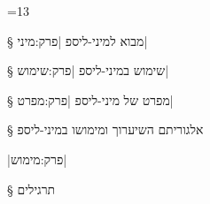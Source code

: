 \def\Title{שפת מיני-ליספ וכתיבת המשערך שלה בה עצמה}


\providecommand{\TopAlign}[1]{\adjustbox{valign=t}{#1}}

{%
    \makeatletter
    =13\relax%
    \gdef\fixNewLine{%
        \def^^M{\space}%
    }%
}

§ מבוא למיני-ליספ 
|פרק:מיני|


§ שימוש במיני-ליספ 
|פרק:שימוש|


§ מפרט של מיני-ליספ
|פרק:מפרט|


§ אלגוריתם השיערוך ומימושו במיני-ליספ 

|פרק:מימוש|

§ תרגילים

